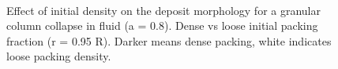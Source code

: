\begin{figure}[h]
\centering
{}\\
\caption[Effect of initial density on the deposit morphology
for a granular column collapse in fluid (a = 0.8).]{Effect of initial density 
on the deposit morphology
for a granular column collapse in fluid (a = 0.8). Dense vs loose initial 
packing fraction (r = 0.95 R). Darker means dense packing, white indicates 
loose 
packing density.}
\label{fig:Dense_Loose_PT}
\end{figure}


